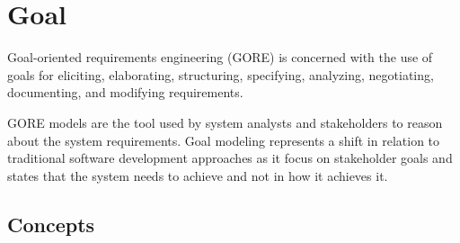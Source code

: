 \section{Goal}

Goal-oriented requirements engineering (GORE) is concerned with the use of goals for eliciting, elaborating, structuring, specifying, analyzing, negotiating, documenting, and modifying requirements\cite{van_lamsweerde_goal-oriented_2001}.

GORE models are the tool used by system analysts and stakeholders to reason about the system requirements. Goal modeling represents a shift in relation to traditional software development approaches as it focus on stakeholder goals and states that the system needs to achieve and not in how it achieves it\cite{ali_goal-based_2010}.


\subsection{Concepts}


